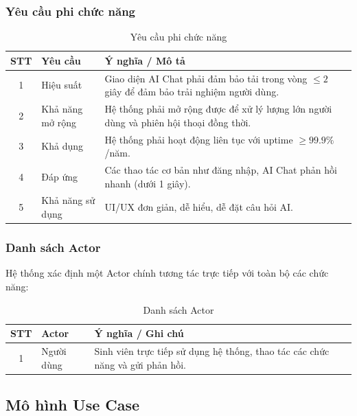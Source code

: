 \subsubsection{Yêu cầu phi chức năng}

\begin{table}[H]
	\centering
	\caption{Yêu cầu phi chức năng}
	\label{tab:yc_phi_cn}

	\renewcommand{\arraystretch}{1.5}
	\begin{tabular}{|c|l|p{9cm}|}
		\hline
		STT & Yêu cầu & Ý nghĩa / Mô tả \\
		\hline
		1 & Hiệu suất & Giao diện AI Chat phải đảm bảo tải trong vòng $\leq 2$ giây để đảm bảo trải nghiệm người dùng. \\
		\hline
		2 & Khả năng mở rộng & Hệ thống phải mở rộng được để xử lý lượng lớn người dùng và phiên hội thoại đồng thời. \\
		\hline
		3 & Khả dụng & Hệ thống phải hoạt động liên tục với uptime $\geq 99.9\%$/năm. \\
		\hline
		4 & Đáp ứng & Các thao tác cơ bản như đăng nhập, AI Chat phản hồi nhanh (dưới 1 giây). \\
		\hline
		5 & Khả năng sử dụng & UI/UX đơn giản, dễ hiểu, dễ đặt câu hỏi AI. \\
		\hline
	\end{tabular}
\end{table}

\subsubsection{Danh sách Actor}

Hệ thống xác định một Actor chính tương tác trực tiếp với toàn bộ các chức năng:

\begin{table}[H]
	\centering
	\caption{Danh sách Actor}
	\label{tab:actor}

	\renewcommand{\arraystretch}{1.5}
	\begin{tabular}{|c|l|p{9cm}|}
		\hline
		STT & Actor & Ý nghĩa / Ghi chú \\
		\hline
		1 & Người dùng & Sinh viên trực tiếp sử dụng hệ thống, thao tác các chức năng và gửi phản hồi. \\
		\hline
	\end{tabular}
\end{table}

\subsection{Mô hình Use Case}

